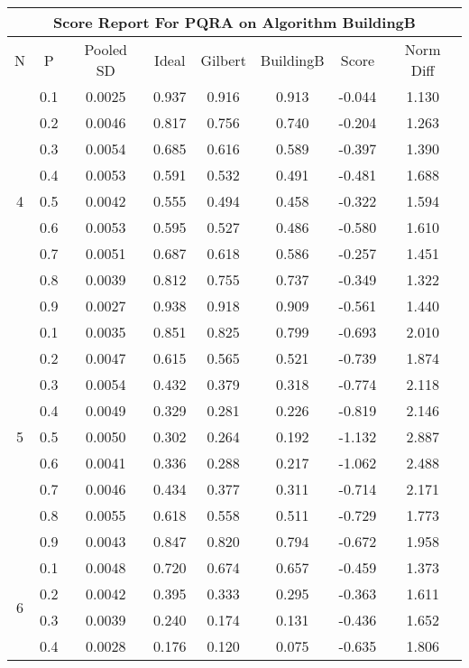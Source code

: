 \documentclass[11pt,a4paper]{report}
\begin{document}
\begin{longtable}{ | c | c || c | c | c | c | c | c | }
\hline
\multicolumn{8}{|c|}{ Score Report For PQRA on Algorithm BuildingB} \\
\hline
N & P & Pooled SD &  Ideal &  Gilbert & BuildingB  & Score & Norm Diff \\
 \hline
 \hline
 \endhead
\multirow{9}{*}{4} & 0.1 & 0.0025 & 0.937 & 0.916 & 0.913 & -0.044 & 1.130 \\
 & 0.2 & 0.0046 & 0.817 & 0.756 & 0.740 & -0.204 & 1.263 \\
 & 0.3 & 0.0054 & 0.685 & 0.616 & 0.589 & -0.397 & 1.390 \\
 & 0.4 & 0.0053 & 0.591 & 0.532 & 0.491 & -0.481 & 1.688 \\
 & 0.5 & 0.0042 & 0.555 & 0.494 & 0.458 & -0.322 & 1.594 \\
 & 0.6 & 0.0053 & 0.595 & 0.527 & 0.486 & -0.580 & 1.610 \\
 & 0.7 & 0.0051 & 0.687 & 0.618 & 0.586 & -0.257 & 1.451 \\
 & 0.8 & 0.0039 & 0.812 & 0.755 & 0.737 & -0.349 & 1.322 \\
 & 0.9 & 0.0027 & 0.938 & 0.918 & 0.909 & -0.561 & 1.440 \\
 \hline
\multirow{9}{*}{5} & 0.1 & 0.0035 & 0.851 & 0.825 & 0.799 & -0.693 & 2.010 \\
 & 0.2 & 0.0047 & 0.615 & 0.565 & 0.521 & -0.739 & 1.874 \\
 & 0.3 & 0.0054 & 0.432 & 0.379 & 0.318 & -0.774 & 2.118 \\
 & 0.4 & 0.0049 & 0.329 & 0.281 & 0.226 & -0.819 & 2.146 \\
 & 0.5 & 0.0050 & 0.302 & 0.264 & 0.192 & -1.132 & 2.887 \\
 & 0.6 & 0.0041 & 0.336 & 0.288 & 0.217 & -1.062 & 2.488 \\
 & 0.7 & 0.0046 & 0.434 & 0.377 & 0.311 & -0.714 & 2.171 \\
 & 0.8 & 0.0055 & 0.618 & 0.558 & 0.511 & -0.729 & 1.773 \\
 & 0.9 & 0.0043 & 0.847 & 0.820 & 0.794 & -0.672 & 1.958 \\
 \hline
\multirow{9}{*}{6} & 0.1 & 0.0048 & 0.720 & 0.674 & 0.657 & -0.459 & 1.373 \\
 & 0.2 & 0.0042 & 0.395 & 0.333 & 0.295 & -0.363 & 1.611 \\
 & 0.3 & 0.0039 & 0.240 & 0.174 & 0.131 & -0.436 & 1.652 \\
 & 0.4 & 0.0028 & 0.176 & 0.120 & 0.075 & -0.635 & 1.806 \\

\end{longtable}
\end{document}
